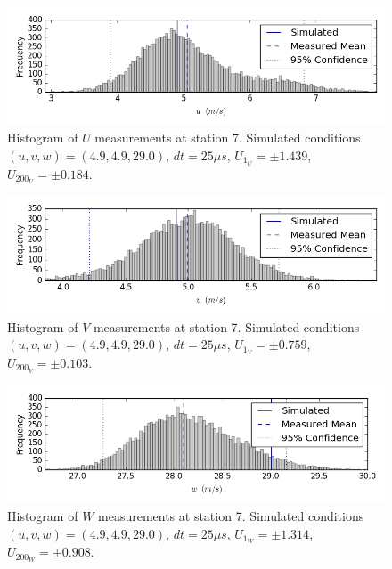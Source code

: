 \begin{figure}[H]
\centering
\includegraphics[width=6in]{figs/Ely_May28th07001/uncertainty_Ely_May28th07001_U}
\caption{Histogram of $U$ measurements at station 7. Simulated conditions 
$(u,v,w)=(4.9, 4.9, 29.0)$, $dt=25 \mu s$, $U_{1_{U}}=\pm 1.439$, 
$U_{200_{U}}=\pm 0.184$.}
\label{fig:uncertainty_Ely_May28th07001_U}
\end{figure}


\begin{figure}[H]
\centering
\includegraphics[width=6in]{figs/Ely_May28th07001/uncertainty_Ely_May28th07001_V}
\caption{Histogram of $V$ measurements at station 7. Simulated conditions 
$(u,v,w)=(4.9, 4.9, 29.0)$, $dt=25 \mu s$, $U_{1_{V}}=\pm 0.759$, 
$U_{200_{V}}=\pm 0.103$.}
\label{fig:uncertainty_Ely_May28th07001_V}
\end{figure}


\begin{figure}[H]
\centering
\includegraphics[width=6in]{figs/Ely_May28th07001/uncertainty_Ely_May28th07001_W}
\caption{Histogram of $W$ measurements at station 7. Simulated conditions 
$(u,v,w)=(4.9, 4.9, 29.0)$, $dt=25 \mu s$, $U_{1_{W}}=\pm 1.314$, 
$U_{200_{W}}=\pm 0.908$.}
\label{fig:uncertainty_Ely_May28th07001_W}
\end{figure}


